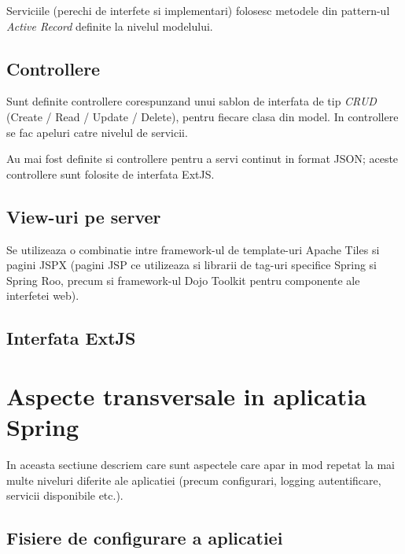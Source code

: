 Serviciile (perechi de interfete si implementari) folosesc 
metodele din pattern-ul \emph{Active Record} definite la nivelul modelului.


\subsection{Controllere}
Sunt definite controllere corespunzand unui sablon de interfata de tip \emph{CRUD}
(Create / Read / Update / Delete), pentru fiecare clasa din model. 
In controllere se fac apeluri catre nivelul de servicii.

Au mai fost definite si controllere pentru a servi continut in format JSON;
aceste controllere sunt folosite de interfata ExtJS. 

\subsection{View-uri pe server}
Se utilizeaza o combinatie intre framework-ul de template-uri Apache Tiles %
si pagini JSPX
(pagini JSP ce utilizeaza si librarii de tag-uri specifice Spring si Spring Roo, 
precum si framework-ul Dojo Toolkit pentru componente ale interfetei web).

\subsection{Interfata ExtJS}



\section{Aspecte transversale in aplicatia Spring}
In aceasta sectiune descriem care sunt aspectele care apar in mod repetat la mai
multe niveluri diferite ale aplicatiei (precum configurari, logging
autentificare, servicii disponibile etc.).

\subsection{Fisiere de configurare a aplicatiei}
\label{fisiere_configurare}


